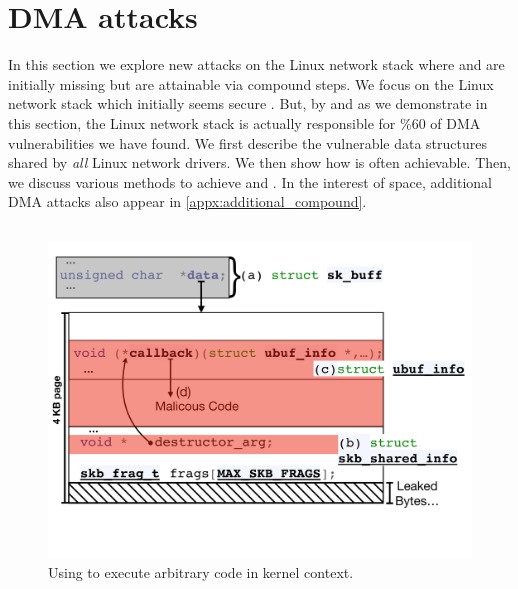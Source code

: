 \section{\Compound{} DMA attacks}\label{sec:linux_net}


In this section we explore new attacks on the Linux network stack where \means and \oportunity are initially missing but are attainable via compound steps.
We focus on the Linux network stack which initially seems secure \cite{thunder}. 
But, by \tool and as we demonstrate in this section, the Linux network stack is actually responsible for \%60 of DMA vulnerabilities we have found. 
We first describe the vulnerable data structures shared by \emph{all} Linux network drivers. We then show how \oportunity is often achievable. Then, we discuss various methods to achieve \means and \motivation. 
In the interest of space, additional DMA attacks also appear in \ref{appx:additional_compound}.

\subsection{\shinfo}
\begin{figure}[t]
    \centering
    \includegraphics[width=\linewidth]{figs/ubuf.pdf}
    \caption{Using \shinfo{} to execute arbitrary code in kernel context.}
    \label{fig:sh_info}
\end{figure}

